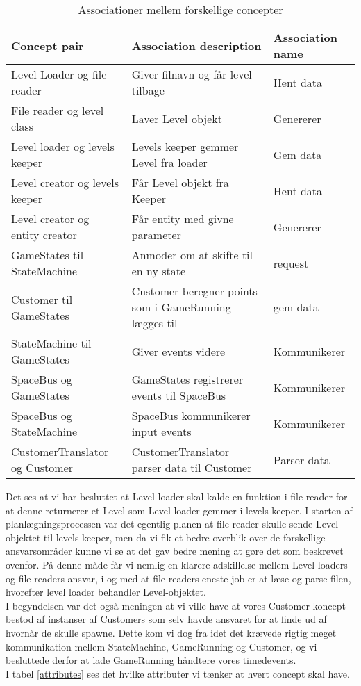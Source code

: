 \begin{table}[!h]
\hspace{-85pt}
\begin{tabular}{|l|l|l|}
\hline
\textbf{Concept pair}           & \textbf{Association description}      & \textbf{Association name} \\ \hline
Level Loader og file reader     & Giver filnavn og får level tilbage    & Hent data                 \\ \hline
File reader og level class      & Laver Level objekt                    & Genererer                 \\ \hline
Level loader og levels keeper   & Levels keeper gemmer Level fra loader & Gem data                  \\ \hline
Level creator og levels keeper  & Får Level objekt fra Keeper           & Hent data                 \\ \hline
Level creator og entity creator & Får entity med givne parameter        & Genererer                 \\ \hline
GameStates til StateMachine & Anmoder om at skifte til en ny state & request \\ \hline
Customer til GameStates & Customer beregner points som i GameRunning lægges til & gem data \\ \hline
StateMachine til GameStates & Giver events videre & Kommunikerer \\\hline
SpaceBus og GameStates & GameStates registrerer events til SpaceBus & Kommunikerer\\\hline
SpaceBus og StateMachine & SpaceBus kommunikerer input events & Kommunikerer \\\hline
CustomerTranslator og Customer & CustomerTranslator parser data til Customer & Parser data \\ \hline
\end{tabular}
\caption{Associationer mellem forskellige concepter}
\label{associations}
\end{table}

Det ses at vi har besluttet at Level loader skal kalde en funktion i file reader for at denne returnerer et Level som Level loader gemmer i levels keeper. I starten af planlægningsprocessen var det egentlig planen at file reader skulle sende Level-objektet til levels keeper, men da vi fik et bedre overblik over de forskellige ansvarsområder kunne vi se at det gav bedre mening at gøre det som beskrevet ovenfor. På denne måde får vi nemlig en klarere adskillelse mellem Level loaders og file readers ansvar, i og med at file readers eneste job er at læse og parse filen, hvorefter level loader behandler Level-objektet.\\
I begyndelsen var det også meningen at vi ville have at vores Customer koncept bestod af instanser af Customers som selv havde ansvaret for at finde ud af hvornår de skulle spawne. Dette kom vi dog fra idet det krævede rigtig meget kommunikation mellem StateMachine, GameRunning og Customer, og vi besluttede derfor at lade GameRunning håndtere vores timedevents.\\
I tabel \ref{attributes} ses det hvilke attributer vi tænker at hvert concept skal have.


